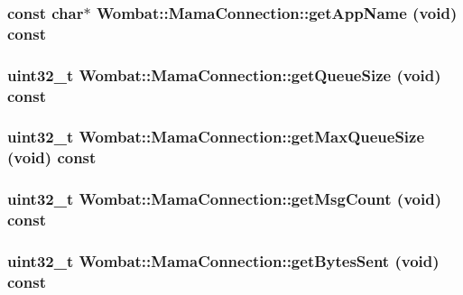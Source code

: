 \hypertarget{classWombat_1_1MamaConnection_af53c320dfce738424b478b31fa52abfc}{
\subsubsection[{getAppName}]{\setlength{\rightskip}{0pt plus 5cm}const char$\ast$ Wombat::MamaConnection::getAppName (void) const}}
\label{classWombat_1_1MamaConnection_af53c320dfce738424b478b31fa52abfc}
\hypertarget{classWombat_1_1MamaConnection_a10311130758eab5e21e6eff252f14edf}{
\subsubsection[{getQueueSize}]{\setlength{\rightskip}{0pt plus 5cm}uint32\_\-t Wombat::MamaConnection::getQueueSize (void) const}}
\label{classWombat_1_1MamaConnection_a10311130758eab5e21e6eff252f14edf}
\hypertarget{classWombat_1_1MamaConnection_a983177404505ec66b55f6746d170b399}{
\subsubsection[{getMaxQueueSize}]{\setlength{\rightskip}{0pt plus 5cm}uint32\_\-t Wombat::MamaConnection::getMaxQueueSize (void) const}}
\label{classWombat_1_1MamaConnection_a983177404505ec66b55f6746d170b399}
\hypertarget{classWombat_1_1MamaConnection_a54904b67b908397e14d86f1881277a2f}{
\subsubsection[{getMsgCount}]{\setlength{\rightskip}{0pt plus 5cm}uint32\_\-t Wombat::MamaConnection::getMsgCount (void) const}}
\label{classWombat_1_1MamaConnection_a54904b67b908397e14d86f1881277a2f}
\hypertarget{classWombat_1_1MamaConnection_a545f8a3b6228e04251f4de66ebd69cd8}{
\subsubsection[{getBytesSent}]{\setlength{\rightskip}{0pt plus 5cm}uint32\_\-t Wombat::MamaConnection::getBytesSent (void) const}}
